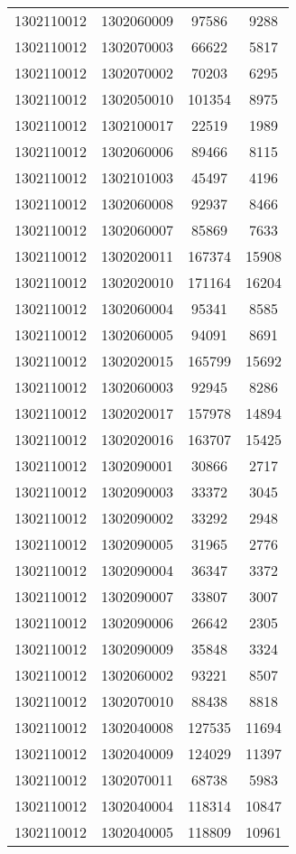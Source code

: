 \begin{longtable}{llcc}
1302110012 & 1302060009 & 97586 & 9288\\
1302110012 & 1302070003 & 66622 & 5817\\
1302110012 & 1302070002 & 70203 & 6295\\
1302110012 & 1302050010 & 101354 & 8975\\
1302110012 & 1302100017 & 22519 & 1989\\
1302110012 & 1302060006 & 89466 & 8115\\
1302110012 & 1302101003 & 45497 & 4196\\
1302110012 & 1302060008 & 92937 & 8466\\
1302110012 & 1302060007 & 85869 & 7633\\
1302110012 & 1302020011 & 167374 & 15908\\
1302110012 & 1302020010 & 171164 & 16204\\
1302110012 & 1302060004 & 95341 & 8585\\
1302110012 & 1302060005 & 94091 & 8691\\
1302110012 & 1302020015 & 165799 & 15692\\
1302110012 & 1302060003 & 92945 & 8286\\
1302110012 & 1302020017 & 157978 & 14894\\
1302110012 & 1302020016 & 163707 & 15425\\
1302110012 & 1302090001 & 30866 & 2717\\
1302110012 & 1302090003 & 33372 & 3045\\
1302110012 & 1302090002 & 33292 & 2948\\
1302110012 & 1302090005 & 31965 & 2776\\
1302110012 & 1302090004 & 36347 & 3372\\
1302110012 & 1302090007 & 33807 & 3007\\
1302110012 & 1302090006 & 26642 & 2305\\
1302110012 & 1302090009 & 35848 & 3324\\
1302110012 & 1302060002 & 93221 & 8507\\
1302110012 & 1302070010 & 88438 & 8818\\
1302110012 & 1302040008 & 127535 & 11694\\
1302110012 & 1302040009 & 124029 & 11397\\
1302110012 & 1302070011 & 68738 & 5983\\
1302110012 & 1302040004 & 118314 & 10847\\
1302110012 & 1302040005 & 118809 & 10961\\

\end{longtable}
